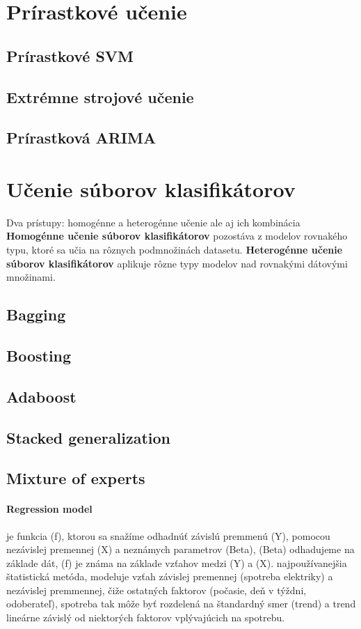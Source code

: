 \documentclass[12pt,oneside,slovak,a4paper]{book}
\begin{document}
\section{Prírastkové učenie}
\subsection{Prírastkové SVM}
\subsection{Extrémne strojové učenie}
\subsection{Prírastková ARIMA}

\section{Učenie súborov klasifikátorov}
Dva prístupy: homogénne a heterogénne učenie ale aj ich kombinácia
\textbf{Homogénne učenie súborov klasifikátorov} pozostáva z modelov rovnakého
typu, ktoré sa učia na rôznych podmnožinách datasetu.
\textbf{Heterogénne učenie súborov klasifikátorov} aplikuje rôzne typy modelov
nad rovnakými dátovými množinami\cite{Grmanova2016}.
\subsection{Bagging}
\subsection{Boosting}
\subsection{Adaboost}
\subsection{Stacked generalization}
\subsection{Mixture of experts}

\paragraph{Regression model}
je funkcia (f), ktorou sa snažíme odhadnúť závislú premmenú (Y), pomocou
nezávislej premennej (X) a neznámych parametrov (Beta), (Beta) odhadujeme na
základe dát, (f) je známa na základe vzťahov medzi (Y) a (X)\cite{Grmanova2016}.
najpoužívanejšia štatistická metóda, modeluje vzťah závislej premennej
(spotreba elektriky) a nezávislej premmennej, čiže ostatných faktorov
(počasie, deň v týždni, odoberateľ), spotreba tak môže byť rozdelená na
štandardný smer (trend) a trend lineárne závislý od niektorých faktorov
vplývajúcich na spotrebu\cite{KumarSingh2013}.
\end{document}

